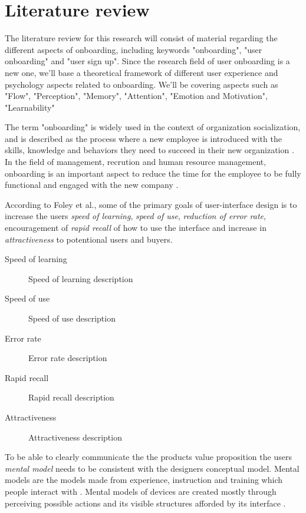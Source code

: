 \chapter{Literature review}
\label{chap:literature_review}

The literature review for this research will consist of material regarding the different aspects of onboarding, including keywords "onboarding", "user onboarding" and "user sign up". Since the research field of user onboarding is a new one, we'll base a theoretical framework of different user experience and psychology aspects related to onboarding. We'll be covering aspects such as "Flow", "Perception", "Memory", "Attention", "Emotion and Motivation", "Learnability"


The term "onboarding" is widely used in the context of organization socialization, and is described as the process where a new employee is introduced with the skills, knowledge and behaviors they need to succeed in their new organization \cite{Bauer2011}. In the field of management, recrution and human resource management, onboarding is an important aspect to reduce the time for the employee to be fully functional and engaged with the new company \cite{GraybillJolieO;HudsonCarpenterMariaTaesil;OffordJeromeJr;PiorunMary;Shaffer2013}.


According to Foley et al., \cite{Foley1996} some of the primary goals of user-interface design is to increase the users \textit{speed of learning}, \textit{speed of use}, \textit{reduction of error rate}, encouragement of \textit{rapid recall} of how to use the interface and increase in \textit{attractiveness} to potentional users and buyers.

\begin{description}
  \item [Speed of learning] Speed of learning description
  \item [Speed of use] Speed of use description
  \item [Error rate]  Error rate description
  \item [Rapid recall] Rapid recall description
  \item [Attractiveness] Attractiveness description
\end{description}

To be able to clearly communicate the the products value proposition the users \textit{mental model} needs to be consistent with the designers conceptual model. Mental models are the models made from experience, instruction and training which people interact with \cite{Norman2013}. Mental models of devices are created mostly through perceiving possible actions and its visible structures afforded by its interface \cite{Norman2013}.

